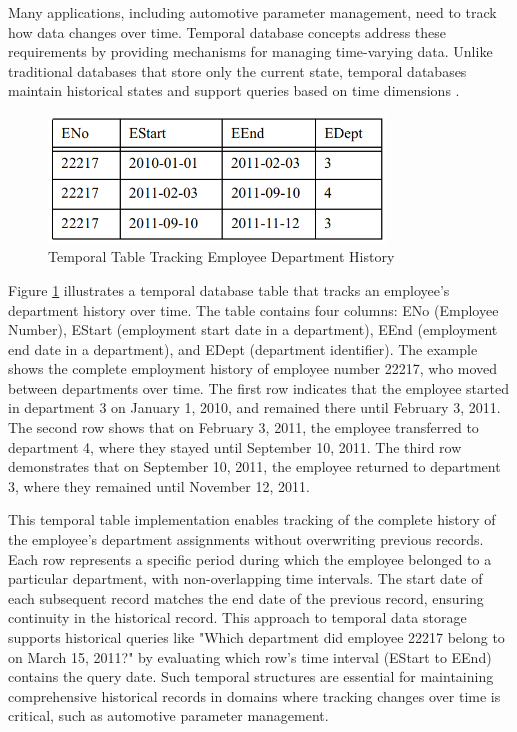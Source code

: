 Many applications, including automotive parameter management, need to track how data changes over time. Temporal database concepts address these requirements by providing mechanisms for managing time-varying data. Unlike traditional databases that store only the current state, temporal databases maintain historical states and support queries based on time dimensions \cite{snodgrass1999developing}.

\begin{figure}[ht]
    \centering
    \includegraphics[width=0.8\textwidth]{figures/temporal_database.png}
    \caption{Temporal Table Tracking Employee Department History}
    \label{fig:temporal-database}
\end{figure}

Figure \ref{fig:temporal-database} illustrates a temporal database table that tracks an employee's department history over time. The table contains four columns: ENo (Employee Number), EStart (employment start date in a department), EEnd (employment end date in a department), and EDept (department identifier). The example shows the complete employment history of employee number 22217, who moved between departments over time. The first row indicates that the employee started in department 3 on January 1, 2010, and remained there until February 3, 2011. The second row shows that on February 3, 2011, the employee transferred to department 4, where they stayed until September 10, 2011. The third row demonstrates that on September 10, 2011, the employee returned to department 3, where they remained until November 12, 2011.

This temporal table implementation enables tracking of the complete history of the employee's department assignments without overwriting previous records. Each row represents a specific period during which the employee belonged to a particular department, with non-overlapping time intervals. The start date of each subsequent record matches the end date of the previous record, ensuring continuity in the historical record. This approach to temporal data storage supports historical queries like "Which department did employee 22217 belong to on March 15, 2011?" by evaluating which row's time interval (EStart to EEnd) contains the query date. Such temporal structures are essential for maintaining comprehensive historical records in domains where tracking changes over time is critical, such as automotive parameter management.

